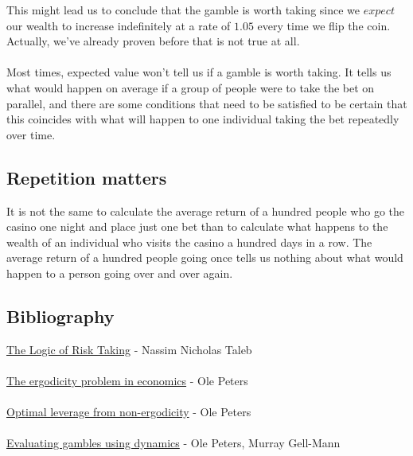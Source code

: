 \documentclass[12pt]{article}
\begin{document}
This might lead us to conclude that the gamble is worth taking since we $expect$ our wealth to increase indefinitely at a rate of $1.05$ every time we flip the coin. Actually, we've already proven before that is not true at all.
\\\\
Most times, expected value won't tell us if a gamble is worth taking. It tells us what would happen on average if a group of people were to take the bet on parallel, and there are some conditions that need to be satisfied to be certain that this coincides with what will happen to one individual taking the bet repeatedly over time.

\subsection{Repetition matters}
It is not the same to calculate the average return of a hundred people who go the casino one night and place just one bet than to calculate what happens to the wealth of an individual who visits the casino a hundred days in a row. The average return of a hundred people going once tells us nothing about what would happen to a person going over and over again.

\subsection{Bibliography}
\href{https://medium.com/incerto/the-logic-of-risk-taking-107bf41029d3}{The Logic of Risk Taking} - Nassim Nicholas Taleb
\\\\
\href{https://www.nature.com/articles/s41567-019-0732-0}{The ergodicity problem in economics} - Ole Peters
\\\\
\href{https://arxiv.org/abs/0902.2965}{Optimal leverage from non-ergodicity} - Ole Peters
\\\\
\href{https://arxiv.org/abs/1405.0585}{Evaluating gambles using dynamics} - Ole Peters, Murray Gell-Mann
\end{document}

